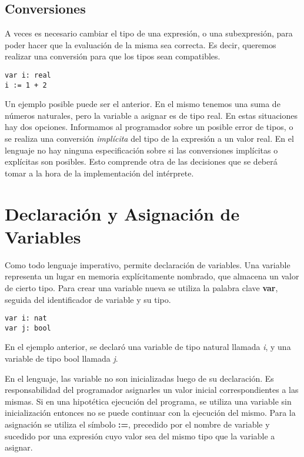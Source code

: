 \documentclass{article}
\begin{document}
\subsection{Conversiones}

A veces es necesario cambiar el tipo de una expresión, o una subexpresión, para poder hacer que la evaluación de la misma sea correcta.
Es decir, queremos realizar una conversión para que los tipos sean compatibles.

\begin{lstlisting}
var i: real
i := 1 + 2
\end{lstlisting}

Un ejemplo posible puede ser el anterior.
En el mismo tenemos una suma de números naturales, pero la variable a asignar es de tipo real.
En estas situaciones hay dos opciones.
Informamos al programador sobre un posible error de tipos, o se realiza una conversión \textit{implícita} del tipo de la expresión a un valor real.
En el lenguaje no hay ninguna especificación sobre si las conversiones implícitas o explícitas son posibles.
Esto comprende otra de las decisiones que se deberá tomar a la hora de la implementación del intérprete.

\section{Declaración y Asignación de Variables}

Como todo lenguaje imperativo, \Lang\space permite declaración de variables.
Una variable representa un lugar en memoria explícitamente nombrado, que almacena un valor de cierto tipo.
Para crear una variable nueva se utiliza la palabra clave \textbf{var}, seguida del identificador de variable y su tipo.

\begin{lstlisting}
var i: nat
var j: bool
\end{lstlisting}

En el ejemplo anterior, se declaró una variable de tipo natural llamada \textit{i}, y una variable de tipo bool llamada \textit{j}.

En el lenguaje, las variable no son inicializadas luego de su declaración.
Es responsabilidad del programador asignarles un valor inicial correspondientes a las mismas.
Si en una hipotética ejecución del programa, se utiliza una variable sin inicialización entonces no se puede continuar con la ejecución del mismo.
Para la asignación se utiliza el símbolo \textbf{:=}, precedido por el nombre de variable y sucedido por una expresión cuyo valor sea del mismo tipo que la variable a asignar.
\end{document}
